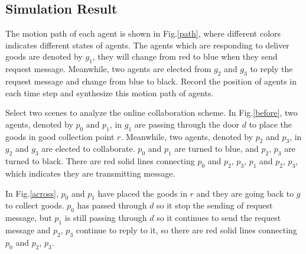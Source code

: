 \documentclass[journal]{IEEEtran}
\begin{document}
\subsection{Simulation Result}
The motion path of each agent is shown in Fig.\ref{path}, where different colors indicates different states of agents. The agents which are responding to deliver goods are denoted by $g_1$, they will change from red to blue when they send request message. Meanwhile, two agents are elected from $g_2$ and $g_3$ to reply the request message and change from blue to black. Record the position of agents in each time step and synthesize this motion path of agents.\par
Select two scenes to analyze the online collaboration scheme. In Fig.\ref{before}, two agents, denoted by $p_0$ and $p_1$, in $g_1$ are passing through the door $d$ to place the goods in good collection point $r$. Meanwhile, two agents, denoted by $p_2$ and $p_3$, in $g_2$ and $g_3$ are elected to collaborate. $p_0$ and $p_1$ are turned to blue, and $p_2$, $p_3$ are turned to black. There are red solid lines connecting $p_0$ and $p_2$, $p_3$, $p_1$ and $p_2$, $p_3$, which indicates they are transmitting message.\par
In Fig.\ref{across}, $p_0$ and $p_1$ have placed the goods in $r$ and they are going back to $g$ to collect goods. $p_0$ has passed through $d$ so it stop the sending of request message, but $p_1$ is still passing through $d$ so it continues to send the request message and $p_2$, $p_3$ continue to reply to it, so there are red solid lines connecting $p_0$ and $p_2$, $p_3$.\par
\end{document}
